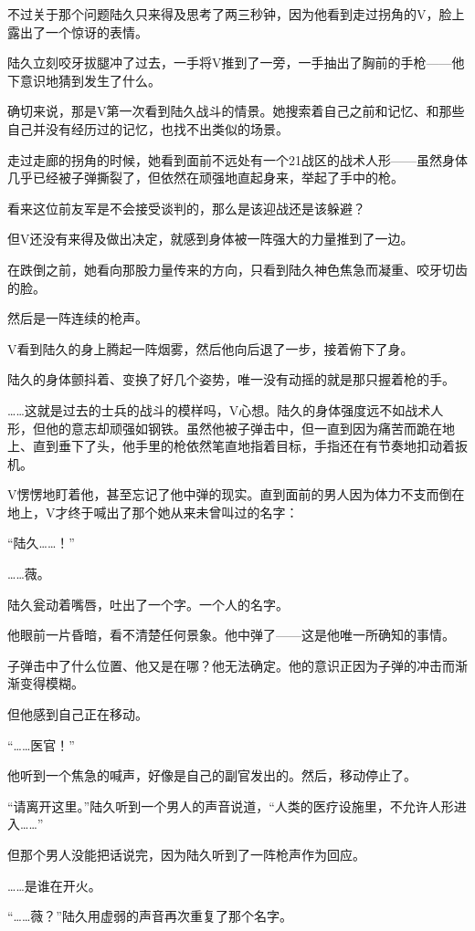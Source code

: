 不过关于那个问题陆久只来得及思考了两三秒钟，因为他看到走过拐角的V，脸上露出了一个惊讶的表情。

陆久立刻咬牙拔腿冲了过去，一手将V推到了一旁，一手抽出了胸前的手枪——他下意识地猜到发生了什么。

确切来说，那是V第一次看到陆久战斗的情景。她搜索着自己之前和记忆、和那些自己并没有经历过的记忆，也找不出类似的场景。

走过走廊的拐角的时候，她看到面前不远处有一个21战区的战术人形——虽然身体几乎已经被子弹撕裂了，但依然在顽强地直起身来，举起了手中的枪。

看来这位前友军是不会接受谈判的，那么是该迎战还是该躲避？

但V还没有来得及做出决定，就感到身体被一阵强大的力量推到了一边。

在跌倒之前，她看向那股力量传来的方向，只看到陆久神色焦急而凝重、咬牙切齿的脸。

然后是一阵连续的枪声。

V看到陆久的身上腾起一阵烟雾，然后他向后退了一步，接着俯下了身。

陆久的身体颤抖着、变换了好几个姿势，唯一没有动摇的就是那只握着枪的手。

……这就是过去的士兵的战斗的模样吗，V心想。陆久的身体强度远不如战术人形，但他的意志却顽强如钢铁。虽然他被子弹击中，但一直到因为痛苦而跪在地上、直到垂下了头，他手里的枪依然笔直地指着目标，手指还在有节奏地扣动着扳机。

V愣愣地盯着他，甚至忘记了他中弹的现实。直到面前的男人因为体力不支而倒在地上，V才终于喊出了那个她从来未曾叫过的名字：

“陆久……！”

……薇。

陆久瓮动着嘴唇，吐出了一个字。一个人的名字。

他眼前一片昏暗，看不清楚任何景象。他中弹了——这是他唯一所确知的事情。

子弹击中了什么位置、他又是在哪？他无法确定。他的意识正因为子弹的冲击而渐渐变得模糊。

但他感到自己正在移动。

“……医官！”

他听到一个焦急的喊声，好像是自己的副官发出的。然后，移动停止了。

“请离开这里。”陆久听到一个男人的声音说道，“人类的医疗设施里，不允许人形进入……”

但那个男人没能把话说完，因为陆久听到了一阵枪声作为回应。

……是谁在开火。

“……薇？”陆久用虚弱的声音再次重复了那个名字。

